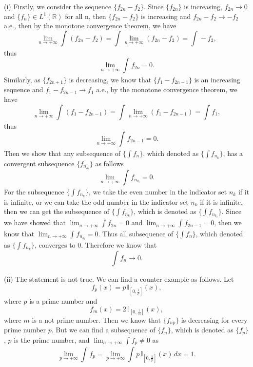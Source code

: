 \documentclass[12pt,a4paper]{ctexart}
\begin{document}
(i) Firstly, we consider the sequence $\{f_{2n} - f_{2}\}$. Since $\{f_{2n}\}$ is increasing, $f_{2n} \to 0$ and $\{f_{n}\} \in L^{1}(\mathbb{R})$ for all n, then $\{f_{2n} - f_{2}\}$ is increasing and $f_{2n} - f_{2} \to -f_{2}$ a.e., then by the monotone convergence theorem, we have
\begin{equation*}
    \lim_{n \to + \infty} \int_{}^{} (f_{2n} - f_{2}) =  \int_{}^{} \lim_{n \to + \infty} (f_{2n} - f_{2}) = \int_{}^{}  - f_{2},
\end{equation*}
thus
\begin{equation*}
    \lim_{n \to + \infty} \int_{}^{} f_{2n} =  0.
\end{equation*}
Similarly, as $\{f_{2n + 1} \}$ is decreasing, we know that  $\{f_{1} - f_{2n -1} \}$ is an increasing sequence and $f_{1} - f_{2n-1} \to f_{1}$ a.e., by the monotone convergence theorem, we have
\begin{equation*}
    \lim_{n \to + \infty} \int_{}^{} (f_{1} - f_{2n-1}) =  \int_{}^{} \lim_{n \to + \infty} (f_{1} - f_{2n-1}) = \int_{}^{}  f_{1},
\end{equation*}
thus
\begin{equation*}
    \lim_{n \to + \infty} \int_{}^{} f_{2n-1} =  0.
\end{equation*}
Then we show that any subsequence of $\{\int f_{n}\}$, which denoted as $\{\int f_{n_{k}}\}$, has a convergent subsequence $\{f_{n_{k_{l}}}\}$ as follows
\begin{equation*}
    \lim_{n \to + \infty} \int_{}^{} f_{n_{k_{l}}} =  0.
\end{equation*}
For the subsequence $\{\int f_{n_{k}}\}$, we take the even number in the indicator set ${n_{k}}$ if it is infinite, or we can take the odd number in the indicator set ${n_{k}}$ if it is infinite, then we can get the subsequence of $\{\int f_{n_{k}}\}$, which is denoted as $\{\int f_{n_{k_{l}}}\}$. Since we have showed that $\lim_{n \to + \infty} \int_{}^{} f_{2n} =  0$ and $\lim_{n \to + \infty} \int_{}^{} f_{2n-1} =  0$, then we know that $\lim_{n \to + \infty} \int_{}^{} f_{n_{k_{l}}} =  0$. Thus all subsequence of $\{\int f_{n}\}$, which denoted as $\{\int f_{n_{k}}\}$, converges to $0$. Therefore we know that
\begin{equation*}
    \int_{}^{} f_{n} \to 0.
\end{equation*}

(ii) The statement is not true. We can find a counter example as follows. Let
\begin{equation*}
    f_{p} (x) = p \, \mathbb{I}_{[0, \frac{1}{p}]} (x),
\end{equation*}
where $p$ is a prime number and
\begin{equation*}
    f_{m} (x) = 2 \, \mathbb{I}_{[0, \frac{1}{m}]} (x),
\end{equation*}
where $m$ is a not prime number. Then we know that $\{f_{np}\}$ is decreasing for every prime number $p$. But we can find a subsequence of $\{f_{n}\}$, which is denoted as $\{f_{p}\}$, $p$ is the prime number, and $\lim_{n \to + \infty} \int_{}^{} f_{p} \neq 0$ as
\begin{equation*}
    \lim_{p \to + \infty} \int_{}^{} f_{p} = \lim_{p \to + \infty} \int_{}^{} p \, \mathbb{I}_{[0, \frac{1}{p}]} (x) \, d x = 1.
\end{equation*}
\end{document}
